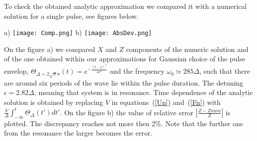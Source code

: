 \documentclass[prb,twocolumn,showpacs,epsfig,epsf]{revtex4}
\newcommand{\abs}[1]{\left\vert#1\right\vert}
\newcommand{\1}{\mathds{1}}
\begin{document}
\begin{widetext}
To check the obtained analytic approximation we compared it with a numerical solution for a single pulse, see figures below.
\begin{center}
a) \texttt{[image: Comp.png]}
\hspace{10pt}b) \texttt{[image: AbsDev.png]}
\end{center}
On the figure a) we compared $X$ and $Z$ components of the numeric solution and of the one obtained within our approximations for Gaussian choice of the pulse envelop, $\Theta_{\Delta=2\sqrt{\pi}\sigma}(t)=e^{-\frac{(t-2)^2}{4\sigma^2}}$ and the frequency $\omega_0\simeq 285 \Delta$, such that there are around six periods of the wave lie within the pulse duration. The detuning $\epsilon=2.82 \Delta$, meaning that system is in resonance. Time dependence of the analytic solution is obtained by replacing $V$ in equations~(\ref{Un}) and~(\ref{Fn}) with $\frac{V}{\Delta}\int_{-\infty}^t\Theta_{\Delta}(t') dt'$.  On the figure b) the value of relative error $\abs{\frac{Z-Z num}{Z}}$ is plotted. The discrepancy reaches not more then 2\%. Note that the further one from the resonance the larger becomes the error.


\end{widetext}
\end{document}
